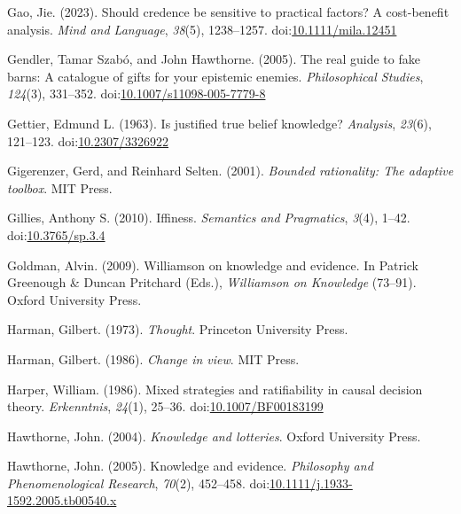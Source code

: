 \documentclass[
  10pt,
  letterpaper,
  twoside]{scrbook}
\newlength{\cslhangindent}
\newenvironment{CSLReferences}[2] %
 {\begin{list}{}{%
  \setlength{\itemindent}{0pt}
  \setlength{\leftmargin}{0pt}
  \setlength{\parsep}{0pt}
  \ifodd #1
   \setlength{\leftmargin}{\cslhangindent}
   \setlength{\itemindent}{-1\cslhangindent}
  \fi
  \setlength{\itemsep}{#2\baselineskip}}}
 {\end{list}}
\begin{document}
\begin{CSLReferences}{1}{0}
Gao, Jie. (2023). Should credence be sensitive to practical factors? A
cost-benefit analysis. \emph{Mind and Language}, \emph{38}(5),
1238--1257.
doi:\href{https://doi.org/10.1111/mila.12451}{10.1111/mila.12451}

Gendler, Tamar Szabó, and John Hawthorne. (2005). The real guide to fake
barns: A catalogue of gifts for your epistemic enemies.
\emph{Philosophical Studies}, \emph{124}(3), 331--352.
doi:\href{https://doi.org/10.1007/s11098-005-7779-8}{10.1007/s11098-005-7779-8}

Gettier, Edmund L. (1963). Is justified true belief knowledge?
\emph{Analysis}, \emph{23}(6), 121--123.
doi:\href{https://doi.org/10.2307/3326922}{10.2307/3326922}

Gigerenzer, Gerd, and Reinhard Selten. (2001). \emph{Bounded
rationality: The adaptive toolbox}. MIT Press.

Gillies, Anthony S. (2010). Iffiness. \emph{Semantics and Pragmatics},
\emph{3}(4), 1--42.
doi:\href{https://doi.org/10.3765/sp.3.4}{10.3765/sp.3.4}

Goldman, Alvin. (2009). Williamson on knowledge and evidence. In Patrick
Greenough \& Duncan Pritchard (Eds.), \emph{{Williamson on Knowledge}}
(73--91). Oxford University Press.

Harman, Gilbert. (1973). \emph{Thought}. Princeton University Press.

Harman, Gilbert. (1986). \emph{Change in view}. {MIT} Press.

Harper, William. (1986). Mixed strategies and ratifiability in causal
decision theory. \emph{Erkenntnis}, \emph{24}(1), 25--36.
doi:\href{https://doi.org/10.1007/BF00183199}{10.1007/BF00183199}

Hawthorne, John. (2004). \emph{Knowledge and lotteries}. Oxford
University Press.

Hawthorne, John. (2005). Knowledge and evidence. \emph{Philosophy and
Phenomenological Research}, \emph{70}(2), 452--458.
doi:\href{https://doi.org/10.1111/j.1933-1592.2005.tb00540.x}{10.1111/j.1933-1592.2005.tb00540.x}


\end{CSLReferences}
\end{document}
